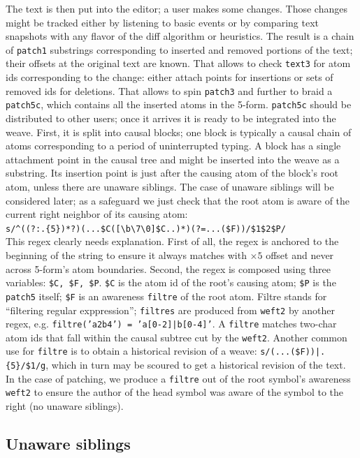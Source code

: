 \documentclass{acm_proc_article-sp}
\begin{document}
The text is then put into the editor; a user makes some
changes. Those changes might be tracked either by listening to 
basic events or by comparing text snapshots with 
any flavor of the diff algorithm or heuristics.
The result is a chain of {\tt patch1} substrings
corresponding to inserted and removed portions of the text;
their offsets at the original text are known. That allows
to check {\tt text3} for atom ids corresponding to the
change: either attach points for insertions or sets of
removed ids for deletions. That allows to spin {\tt patch3}
and further 
 to braid a {\tt patch5c}, which contains all
the inserted atoms in the 5-form. 
{\tt patch5c} should be distributed to other users;
once it arrives it is ready to be integrated into the weave.
First, it is split into causal blocks; one block is typically
a causal chain of atoms corresponding
to a period of uninterrupted typing.
A block has a single attachment point
in the causal tree and might be inserted into the weave as
a substring.
Its insertion point is just after the causing
atom of the block's root atom, unless there are unaware
siblings. The case of unaware siblings will be considered later;
as a safeguard we just check that the root atom
is aware of the current right neighbor of its causing atom: \\
{\small \verb`s/^((?:.{5})*?)(...$C([\b\7\0]$C..)*)(?=...($F))/$1$2$P/`}\\
This regex clearly needs explanation. First of all, the regex
is anchored to the beginning of the string to ensure it
always matches with $\times 5$ offset and never across 5-form's atom
boundaries. Second, the regex is
composed using three variables: \verb+$C, $F, $P+. \verb+$C+
is the atom id of the root's causing atom; \verb+$P+ is the
{\tt patch5} itself; \verb+$F+ is an awareness {\tt filtre}
of the root atom. Filtre stands for ``filtering regular
exppression''; {\tt filtres} are produced from {\tt weft2} by
another regex, e.g. {\tt filtre('a2b4') = 'a[0-2]|b[0-4]'}.
A {\tt filtre} matches two-char atom ids that fall within
the causal subtree cut by the {\tt weft2}. Another common
use for {\tt filtre} is to obtain a historical revision of a
weave: 
{\small \verb`s/(...($F))|.{5}/$1/g`}, which in turn
may be scoured to get a historical revision of the text.
In the case of patching, we produce a {\tt filtre} out of
the root symbol's awareness {\tt weft2} to ensure the author
of the head symbol was aware of the symbol to the right 
(no unaware siblings).

\subsection{Unaware siblings} \label{sec:unre}
\end{document}
